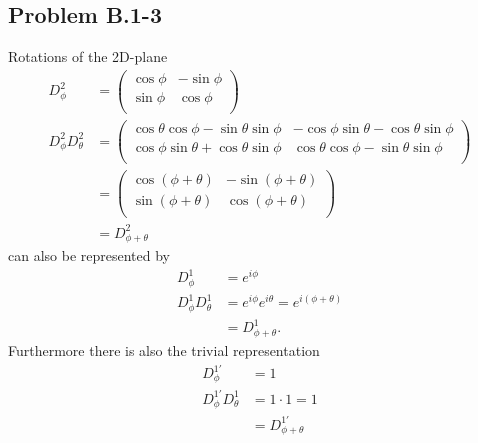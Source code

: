 \documentclass[10pt,a4paper]{book}
\theoremstyle{definition}
\begin{document}
\subsection{Problem B.1-3}
Rotations of the 2D-plane
\begin{align}
D^2_\phi&=\left(
\begin{array}{cc}
\cos\phi& -\sin\phi  \\
\sin\phi & \cos\phi  \\
\end{array}
\right)\\
D^2_\phi D^2_\theta&= \left(
\begin{array}{cc}
 \cos\theta \cos\phi-\sin\theta \sin\phi  & -\cos\phi \sin\theta-\cos\theta\sin\phi \\
 \cos\phi\sin\theta+\cos\theta \sin\phi & \cos\theta \cos\phi
   -\sin\theta \sin\phi \\
\end{array}
\right)\\
&=\left(
\begin{array}{cc}
\cos(\phi+\theta)& -\sin(\phi+\theta)  \\
\sin(\phi+\theta) & \cos(\phi+\theta)  \\
\end{array}
\right)\\
&=D^2_{\phi+\theta}
\end{align}
can also be represented by
\begin{align}
D^1_\phi&=e^{i\phi}\\
D^1_\phi D^1_\theta&=e^{i\phi}e^{i\theta}=e^{i(\phi+\theta)}\\
&=D^1_{\phi+\theta}.
\end{align}
Furthermore there is also the trivial representation
\begin{align}
D^{1'}_\phi&=1\\
D^{1'}_\phi D^1_\theta&=1\cdot1=1\\
&=D^{1'}_{\phi+\theta}
\end{align}
\end{document}
